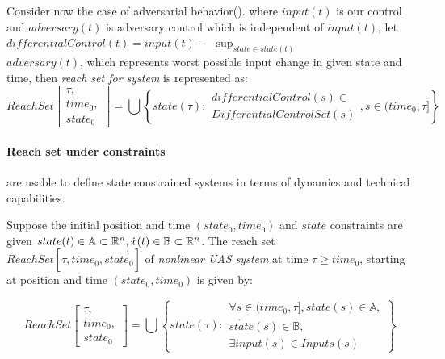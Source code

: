     \begin{definition}
        Consider now the case of adversarial behavior(\cite{game1987,game1988}).
        where $input(t)$ is our control and $adversary(t)$ is adversary control which is independent of $input(t)$, let $differentialControl(t)=input(t)-$ $\sup_{{state} \in state(t)}$\\ $adversary(t)$, which represents worst possible input change in given state and time, then \emph{reach set for system} is represented as:
        \begin{equation}
            ReachSet\left[\begin{gathered}\tau,\\ time_0,\\ state_0\end{gathered}\right] = \bigcup \left\{state(\tau): 
                \begin{aligned}
                    differentialControl(s)\in\\  DifferentialControlSet(s)
                \end{aligned}
            ,s \in (time_0,\tau]\right\}
        \end{equation}
    \end{definition}

    \paragraph{Reach set under constraints} are usable to define state constrained systems in terms of dynamics and technical capabilities.
    
    \begin{definition}
        Suppose the initial position and time $(state_0, time_0)$ and $state$ constraints are given $state(t) \in \mathbb{A} \subset \mathbb{R}^n, \dot{x}(t) \in \mathbb{B} \subset \mathbb{R}^n$. The reach set $ReachSet[\tau, time_0, \vec{state}_0]$ of \emph{nonlinear UAS system} at time $\tau \ge time_0$, starting at position and time $(state_0, time_0)$ is given by:
        
        \begin{equation}
            ReachSet\left[\begin{gathered}\tau,\\ time_0,\\ state_0\end{gathered}\right] = \bigcup 
            \left\{
                state(\tau):
                \begin{gathered}
                    \forall s\in (time_0,\tau], state(s) \in \mathbb{A},\\ 
                    \dot{state}(s) \in \mathbb{B},\\ 
                    \exists input(s) \in Inputs(s)
                \end{gathered}
            \right\}
        \end{equation}
        
    \end{definition}


